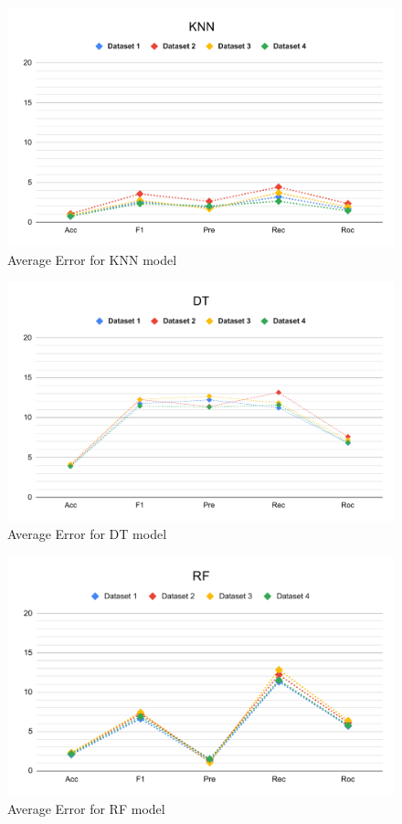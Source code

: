 \begin{figure}[ht]
    \centering
    \includegraphics[width=1.9\columnwidth]{media/ch_result_and_testing/delta_KNN.pdf}
    \caption{Average Error for KNN model} \label{fig:perfromance_delta_knn}
\end{figure}

\begin{figure}[ht]
    \centering
    \includegraphics[width=1.9\columnwidth]{media/ch_result_and_testing/delta_DT.pdf}
    \caption{Average Error for DT model} \label{fig:perfromance_delta_dt}
\end{figure}

\begin{figure}[ht]
    \centering
    \includegraphics[width=1.9\columnwidth]{media/ch_result_and_testing/delta_RF.pdf}
    \caption{Average Error for RF model} \label{fig:perfromance_delta_rf}
\end{figure}

